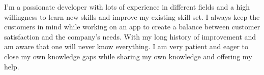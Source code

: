 \documentclass[11pt, a4paper]{awesome-cv}
\begin{document}
\begin{cvletter}
I'm a passionate developer with lots of experience in different fields and a high willingness to learn new skills and improve my existing skill set. I always keep the customers in mind while working on an app to create a balance between customer satisfaction and the company’s needs. With my long history of improvement and am aware that one will never know everything. I am very patient and eager to close my own knowledge gaps while sharing my own knowledge and offering my help.
\end{cvletter}


\makeletterclosing
\end{document}
